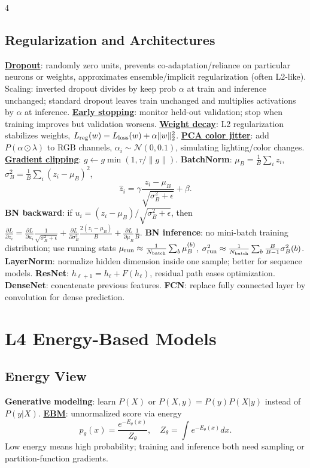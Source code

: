 \documentclass{article}
\newcommand{\key}[1]{\textbf{#1}}
\newcommand{\lowterm}[1]{\textbf{\underline{#1}}}
\newcommand{\N}{\mathcal{N}}
\newcommand{\1}{\mathbf 1}
\begin{document}
\begin{multicols*}{4}
\subsection{Regularization and Architectures}
\lowterm{Dropout}: randomly zero units, prevents co-adaptation/reliance on particular neurons or weights, approximates ensemble/implicit regularization (often L2-like). Scaling: inverted dropout divides by keep prob $\alpha$ at train and inference unchanged; standard dropout leaves train unchanged and multiplies activations by $\alpha$ at inference. \lowterm{Early stopping}: monitor held-out validation; stop when training improves but validation worsens. \lowterm{Weight decay}: L2 regularization stabilizes weights,
$L_{\rm reg}(w)=L_{\rm loss}(w)+\alpha\|w\|_2^2$. \lowterm{PCA color jitter}: add $P(\alpha\odot\lambda)$ to RGB channels, $\alpha_i\sim\N(0,0.1)$, simulating lighting/color changes. \lowterm{Gradient clipping}: $g\leftarrow g\min(1,\tau/\|g\|)$.
\key{BatchNorm}: $\mu_B=\frac1B\sum_i z_i$, $\sigma_B^2=\frac1B\sum_i(z_i-\mu_B)^2$,
\[
\hat z_i=\gamma\frac{z_i-\mu_B}{\sqrt{\sigma_B^2+\epsilon}}+\beta.
\]
\key{BN backward}: if $u_i=(z_i-\mu_B)/\sqrt{\sigma_B^2+\epsilon}$, then
$\frac{\partial L}{\partial z_i}=\frac{\partial L}{\partial u_i}\frac1{\sqrt{\sigma_B^2+\epsilon}}+\frac{\partial L}{\partial\sigma_B^2}\frac{2(z_i-\mu_B)}{B}+\frac{\partial L}{\partial\mu_B}\frac1B$.
\key{BN inference}: no mini-batch training distribution; use running stats
$\mu_{\rm run}\approx\frac1{N_{\rm batch}}\sum_b\mu_B^{(b)}$, $\sigma_{\rm run}^2\approx\frac1{N_{\rm batch}}\sum_b\frac{B}{B-1}\sigma_B^2(b)$.
\key{LayerNorm}: normalize hidden dimension inside one sample; better for sequence models. \key{ResNet}: $h_{\ell+1}=h_\ell+F(h_\ell)$, residual path eases optimization. \key{DenseNet}: concatenate previous features. \key{FCN}: replace fully connected layer by convolution for dense prediction.

\section{L4 Energy-Based Models}
\subsection{Energy View}
\key{Generative modeling}: learn $P(X)$ or $P(X,y)=P(y)P(X|y)$ instead of $P(y|X)$. \lowterm{EBM}: unnormalized score via energy
\[
p_\theta(x)=\frac{e^{-E_\theta(x)}}{Z_\theta},\quad Z_\theta=\int e^{-E_\theta(x)}dx.
\]
Low energy means high probability; training and inference both need sampling or partition-function gradients.


\end{multicols*}
\end{document}
